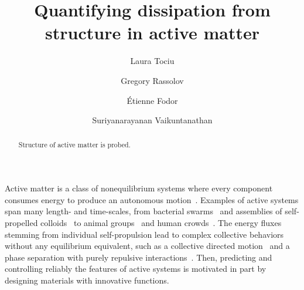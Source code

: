 \documentclass[superscriptaddress, twocolumn, prl, longbibliography, nofootinbib]{revtex4-1}
\begin{document}
\title{Quantifying dissipation from structure in active matter}

\author{Laura Tociu}
\author{Gregory Rassolov}

\author{\'Etienne Fodor}

\author{Suriyanarayanan Vaikuntanathan}

\begin{abstract}
	Structure of active matter is probed.
\end{abstract}

\maketitle




Active matter is a class of nonequilibrium systems where every component consumes energy to produce an autonomous motion~\cite{Marchetti2013, Bechinger2016, Marchetti2018}. Examples of active systems span many length- and time-scales, from bacterial swarms~\cite{Libchaber2000, Elgeti2015} and assemblies of self-propelled colloids~\cite{Bechinger2013, Palacci2013} to animal groups~\cite{Cavagna2010, Cavagna2014} and human crowds~\cite{Bottinelli2016, Bartolo2019}. The energy fluxes stemming from individual self-propulsion lead to complex collective behaviors without any equilibrium equivalent, such as a collective directed motion~\cite{Dauchot2010, Sood2014} and a phase separation with purely repulsive interactions~\cite{Bechinger2013, Palacci2013}. Then, predicting and controlling reliably the features of active systems is motivated in part by designing materials with innovative functions.
\end{document}
